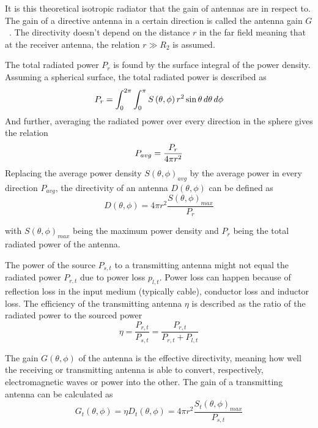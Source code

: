 It is this theoretical isotropic radiator that the gain of antennas are in respect to. The gain of a directive antenna in a certain direction is called the antenna gain $G$~\cite[p. 12]{ant_beam_form}. The directivity doesn't depend on the distance $r$ in the far field meaning that at the receiver antenna, the relation $r \gg  R_2$ is assumed. 

The total radiated power $P_{r}$ is found by the surface integral of the power density. Assuming a spherical surface, the total radiated power is described as
\begin{equation} \label{eq:surface_integral}
    P_{r} = \int_{0}^{2 \pi} \int_{0}^{\pi} S\left( \theta, \phi \right) r^2 \sin \theta \, d\theta \, d\phi
    \tagaddtext{[\si{\watt}]}
\end{equation}
And further, averaging the radiated power over every direction in the sphere gives the relation
\begin{equation} \label{eq:average_power}
    P_{avg} = \frac{P_{r}}{4 \pi r^2}
    \tagaddtext{[\si{\watt\per\meter\squared}]}
\end{equation}
Replacing the average power density $S\left( \theta, \phi \right)_{avg}$ by the average power in every direction $P_{avg}$, the directivity of an antenna $D\left(\theta, \phi\right)$ can be defined as 
\begin{equation} \label{eq:directivity}
    D\left(\theta, \phi\right) = 4 \pi r^2 \frac{S \left(\theta, \phi\right)_{max}}{P_{r}}
\end{equation}

with $S\left(\theta, \phi\right)_{max}$ being the maximum power density and $P_{r}$ being the total radiated power of the antenna.

The power of the source $P_{s,t}$ to a transmitting antenna might not equal the radiated power $P_{r,t}$ due to power loss $p_{l,t}$. Power loss can happen because of reflection loss in the input medium (typically cable), conductor loss and inductor loss. The efficiency of the transmitting antenna $\eta$ is described as the ratio of the radiated power to the sourced power 
\begin{equation} \label{eq:antenna_efficiency}
    \eta = \frac{P_{r,t}}{P_{s,t}} = \frac{P_{r,t}}{P_{r,t}+P_{l,t}}
\end{equation}

The gain $G \left( \theta, \phi \right)$ of the antenna is the effective directivity, meaning how well the receiving or transmitting antenna is able to convert, respectively, electromagnetic waves or power into the other. The gain of a transmitting antenna can be calculated as
\begin{equation} \label{eq:gain}
    G_t \left( \theta, \phi \right) = \eta  D_t \left(\theta, \phi\right) = 4 \pi r^2 \frac{S_t \left(\theta, \phi\right)_{max}}{P_{s,t}}
\end{equation}

